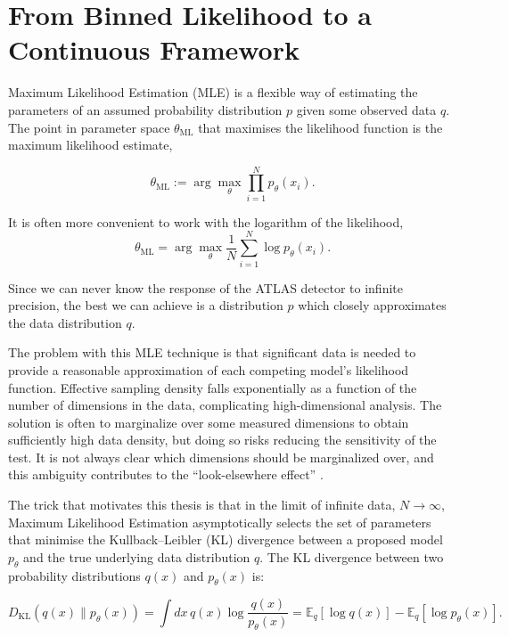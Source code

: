 \section{From Binned Likelihood to a Continuous Framework}
\label{sec:method}

Maximum Likelihood Estimation (MLE) is a flexible way of estimating the parameters of an assumed probability distribution $p$ given some observed data $q$. The point in parameter space $\theta_{\mathrm{ML}}$ that maximises the likelihood function is the maximum likelihood estimate,

\begin{equation}
\theta_{\mathrm{ML}}
:=
\arg\max_{\theta}
\prod_{i=1}^{N} p_{\theta}(x_i).
\end{equation}

It is often more convenient to work with the logarithm of the likelihood,
\begin{equation}
\theta_{\mathrm{ML}}
=
\arg\max_{\theta} \frac{1}{N}
\sum_{i=1}^{N}
\log p_{\theta}(x_i).
\end{equation}

Since we can never know the response of the ATLAS detector to infinite precision, the best we can achieve is a distribution $p$ which closely approximates the data distribution $q$. 

The problem with this MLE technique is that significant data is needed to provide a reasonable approximation of each competing model’s likelihood function. Effective sampling density falls exponentially as a function of the number of dimensions in the data, complicating high-dimensional analysis. The solution is often to marginalize over some measured dimensions to obtain sufficiently high data density, but doing so risks reducing the sensitivity of the test. It is not always clear which dimensions should be marginalized over, and this ambiguity contributes to the ``look-elsewhere effect'' \cite{wilkinson2024divergences}.

The trick that motivates this thesis is that in the limit of infinite data,
$N \to \infty$, Maximum Likelihood Estimation asymptotically selects the set of parameters that minimise the Kullback--Leibler (KL) divergence between a proposed model $p_{\theta}$ and the true underlying data distribution $q$. The KL divergence between two probability distributions $q(x)$ and $p_{\theta}(x)$ is:

\begin{equation}
D_{\mathrm{KL}}(q(x) \parallel p_{\theta}(x))
=
\int dx \,
q(x)
\log
\frac{q(x)}{p_{\theta}(x)}
=
\mathbb{E}_{q}[\log q(x)]
-
\mathbb{E}_{q}[\log p_{\theta}(x)].
\end{equation}


